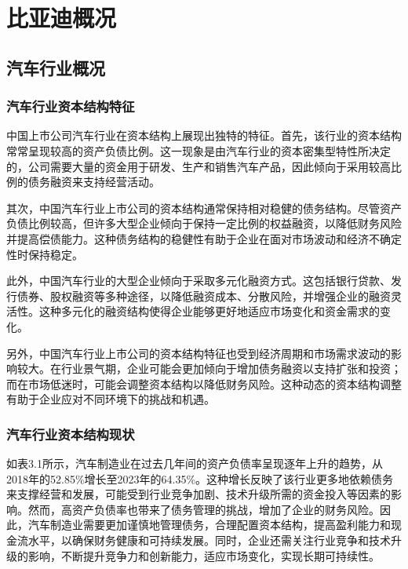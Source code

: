 \chapter{比亚迪概况}
\section{汽车行业概况}
\subsection{汽车行业资本结构特征}
中国上市公司汽车行业在资本结构上展现出独特的特征。首先，该行业的资本结构常常呈现较高的资产负债比例。这一现象是由汽车行业的资本密集型特性所决定的，公司需要大量的资金用于研发、生产和销售汽车产品，因此倾向于采用较高比例的债务融资来支持经营活动。

其次，中国汽车行业上市公司的资本结构通常保持相对稳健的债务结构。尽管资产负债比例较高，但许多大型企业倾向于保持一定比例的权益融资，以降低财务风险并提高偿债能力。这种债务结构的稳健性有助于企业在面对市场波动和经济不确定性时保持稳定。

此外，中国汽车行业的大型企业倾向于采取多元化融资方式。这包括银行贷款、发行债券、股权融资等多种途径，以降低融资成本、分散风险，并增强企业的融资灵活性。这种多元化的融资结构使得企业能够更好地适应市场变化和资金需求的变化。

另外，中国汽车行业上市公司的资本结构特征也受到经济周期和市场需求波动的影响较大。在行业景气期，企业可能会更加倾向于增加债务融资以支持扩张和投资；而在市场低迷时，可能会调整资本结构以降低财务风险。这种动态的资本结构调整有助于企业应对不同环境下的挑战和机遇。
\subsection{汽车行业资本结构现状}
如表3.1所示，汽车制造业在过去几年间的资产负债率呈现逐年上升的趋势，从2018年的52.85\%增长至2023年的64.35\%。这种增长反映了该行业更多地依赖债务来支撑经营和发展，可能受到行业竞争加剧、技术升级所需的资金投入等因素的影响。然而，高资产负债率也带来了债务管理的挑战，增加了企业的财务风险。因此，汽车制造业需要更加谨慎地管理债务，合理配置资本结构，提高盈利能力和现金流水平，以确保财务健康和可持续发展。同时，企业还需关注行业竞争和技术升级的影响，不断提升竞争力和创新能力，适应市场变化，实现长期可持续性。

